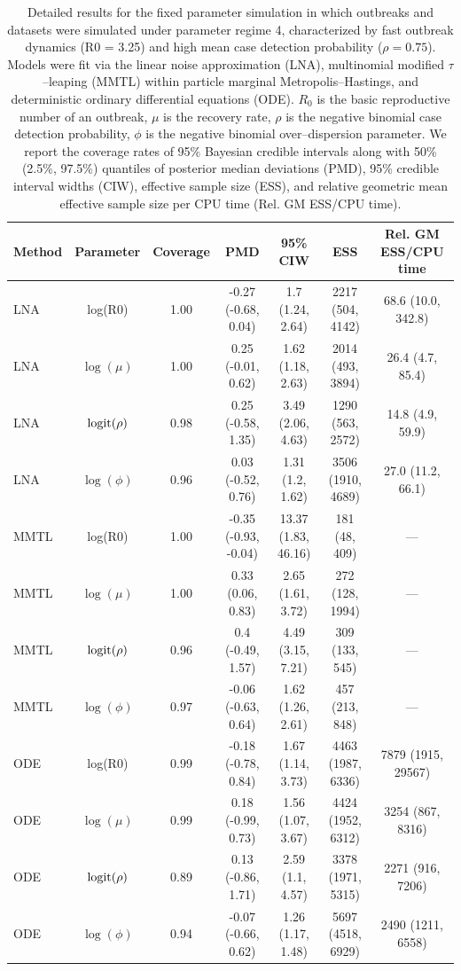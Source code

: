 \begin{table}
	\begin{fullpage}
		\footnotesize
		\centering
		\begin{tabular}{lcccccc}
			\hline
			\textbf{Method} & \textbf{Parameter} & \textbf{Coverage} & \textbf{PMD} & \textbf{95\% CIW} & \textbf{ESS} & \textbf{Rel. GM ESS/CPU time} \\ 
			\hline
			LNA & log(R0) & 1.00 & -0.27 (-0.68, 0.04) & 1.7 (1.24, 2.64) & 2217 (504, 4142) & 68.6 (10.0, 342.8) \\ 
			LNA & $\log(\mu)$ & 1.00 & 0.25 (-0.01, 0.62) & 1.62 (1.18, 2.63) & 2014 (493, 3894) & 26.4 (4.7, 85.4) \\ 
			LNA & $\mathrm{logit}(\rho)$ & 0.98 & 0.25 (-0.58, 1.35) & 3.49 (2.06, 4.63) & 1290 (563, 2572) & 14.8 (4.9, 59.9) \\ 
			LNA & $\log(\phi)$ & 0.96 & 0.03 (-0.52, 0.76) & 1.31 (1.2, 1.62) & 3506 (1910, 4689) & 27.0 (11.2, 66.1) \\ 
			MMTL & log(R0) & 1.00 & -0.35 (-0.93, -0.04) & 13.37 (1.83, 46.16) & 181 (48, 409) & --- \\ 
			MMTL & $\log(\mu)$ & 1.00 & 0.33 (0.06, 0.83) & 2.65 (1.61, 3.72) & 272 (128, 1994) & --- \\ 
			MMTL & $\mathrm{logit}(\rho)$ & 0.96 & 0.4 (-0.49, 1.57) & 4.49 (3.15, 7.21) & 309 (133, 545) & --- \\ 
			MMTL & $\log(\phi)$ & 0.97 & -0.06 (-0.63, 0.64) & 1.62 (1.26, 2.61) & 457 (213, 848) & --- \\ 
			ODE & log(R0) & 0.99 & -0.18 (-0.78, 0.84) & 1.67 (1.14, 3.73) & 4463 (1987, 6336) & 7879 (1915, 29567) \\ 
			ODE & $\log(\mu)$ & 0.99 & 0.18 (-0.99, 0.73) & 1.56 (1.07, 3.67) & 4424 (1952, 6312) & 3254 (867, 8316) \\ 
			ODE & $\mathrm{logit}(\rho)$ & 0.89 & 0.13 (-0.86, 1.71) & 2.59 (1.1, 4.57) & 3378 (1971, 5315) & 2271 (916, 7206) \\ 
			ODE & $\log(\phi)$ & 0.94 & -0.07 (-0.66, 0.62) & 1.26 (1.17, 1.48) & 5697 (4518, 6929) & 2490 (1211, 6558) \\ 
			\hline
		\end{tabular}
		\caption[Fast dynamics, high detection probability regime fixed parameter coverage simulation results.]{Detailed results for the fixed parameter simulation in which outbreaks and datasets were simulated under parameter regime 4, characterized by fast outbreak dynamics (R0 = 3.25) and high mean case detection probability ($ \rho = 0.75 $). Models were fit via the linear noise approximation (LNA), multinomial modified $ \tau $--leaping (MMTL) within particle marginal Metropolis--Hastings, and deterministic ordinary differential equations (ODE). $ R_0 $ is the basic reproductive number of an outbreak, $ \mu $ is the recovery rate, $ \rho $ is the negative binomial case detection probability, $ \phi $ is the negative binomial over--dispersion parameter. We report the coverage rates of 95\% Bayesian credible intervals along with 50\% (2.5\%, 97.5\%) quantiles of posterior median deviations (PMD), 95\% credible interval widths (CIW), effective sample size (ESS), and relative geometric mean effective sample size per CPU time (Rel. GM ESS/CPU time).}

\end{fullpage}
\end{table}
